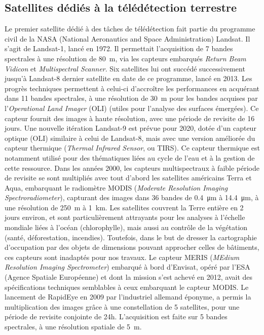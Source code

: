 \subsection{Satellites dédiés à la télédétection terrestre}
Le premier satellite dédié à des tâches de télédétection fait partie du programme civil de la NASA (National Aeronautics and Space Administration) Landsat. Il s'agit de Landsat-1, lancé en 1972. Il permettait l'acquisition de 7 bandes spectrales à une résolution de \SI{80}{\meter}, via les capteurs embarqués \textit{Return Beam Vidicon} et \textit{Multispectral Scanner}. Six satellites lui ont succédé successivement jusqu'à Landsat-8 dernier satellite en date de ce programme, lancé en 2013. Les progrès techniques permettent à celui-ci d'accroître les performances en acquérant dans 11 bandes spectrales, à une résolution de \SI{30}{\meter} pour les bandes acquises par l'\textit{Operational Land Imager} (OLI) (utiles pour l'analyse des surfaces émergées). Ce capteur fournit des images à haute résolution, avec une période de revisite de 16 jours. Une nouvelle itération Landsat-9 est prévue pour 2020, dotée d'un capteur optique (OLI) similaire à celui de Landsat-8, mais avec une version améliorée du capteur thermique (\textit{Thermal Infrared Sensor}, ou TIRS). Ce capteur thermique est notamment utilisé pour des thématiques liées au cycle de l'eau et à la gestion de cette ressource.
Dans les années 2000, les capteurs multispectraux à faible période de revisite se sont multipliés avec tout d'abord les satellites américains Terra et Aqua, embarquant le radiomètre MODIS (\textit{Moderate Resolution Imaging Spectroradiometer}), capturant des images dans 36 bandes de \SI{0,4}{\micro\meter} à \SI{14,4}{\micro\meter}, à une résolution de \SI{250}{\meter} à \SI{1}{\kilo\meter}. Les satellites couvrent la Terre entière en 2 jours environ, et sont particulièrement attrayants pour les analyses à l'échelle mondiale liées à l'océan (chlorophylle), mais aussi au contrôle de la végétation (santé, déforestation, incendies). Toutefois, dans le but de dresser la cartographie d'occupation par des objets de dimensions pouvant approcher celles de bâtiments, ces capteurs sont inadaptés pour nos travaux. Le capteur MERIS (\textit{MEdium Resolution Imaging Spectrometer}) embarqué à bord d'Envisat, opéré par l'ESA (Agence Spatiale Européenne) et dont la mission s'est achevé en 2012, avait des spécifications techniques semblables à ceux embarquant le capteur MODIS. Le lancement de RapidEye en 2009 par l'industriel allemand éponyme, a permis la multiplication des images grâce à une constellation de 5 satellites, pour une période de revisite conjointe de 24h. L'acquisition est faite sur 5 bandes spectrales, à une résolution spatiale de \SI{5}{\meter}.\\
